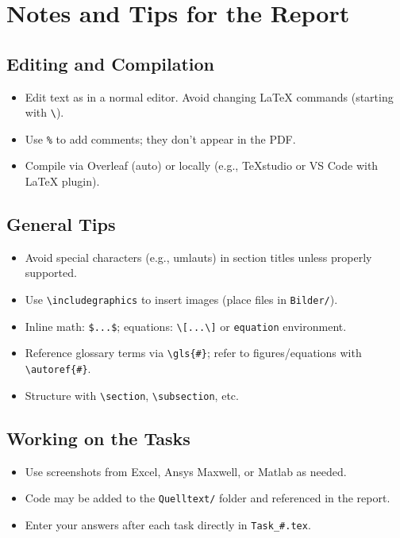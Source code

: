 \chapter*{Notes and Tips for the Report}

\section*{Editing and Compilation}
\begin{itemize}
    \item Edit text as in a normal editor. Avoid changing LaTeX commands (starting with \verb|\|).
    \item Use \verb|%| to add comments; they don’t appear in the PDF.
    \item Compile via Overleaf (auto) or locally (e.g., TeXstudio or VS Code with LaTeX plugin).
\end{itemize}

\section*{General Tips}
\begin{itemize}
    \item Avoid special characters (e.g., umlauts) in section titles unless properly supported.
    \item Use \verb|\includegraphics| to insert images (place files in \texttt{Bilder/}).
    \item Inline math: \verb|$...$|; equations: \verb|\[...\]| or \verb|equation| environment.
    \item Reference glossary terms via \verb|\gls{#}|; refer to figures/equations with \verb|\autoref{#}|.
    \item Structure with \verb|\section|, \verb|\subsection|, etc.
\end{itemize}

\section*{Working on the Tasks}
\begin{itemize}
    \item Use screenshots from Excel, Ansys Maxwell, or Matlab as needed.
    \item Code may be added to the \verb|Quelltext/| folder and referenced in the report.
    \item Enter your answers after each task directly in \verb|Task_#.tex|.
\end{itemize}

